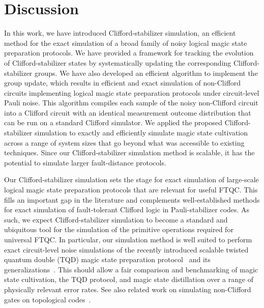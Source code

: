\documentclass[
 reprint,
 amsmath,amssymb,
 pra,superscriptaddress, nofootinbib
]{revtex4-2}
\theoremstyle{definition}
\theoremstyle{plain}
\begin{document}
\section{Discussion}\label{sec:discuss}

In this work, we have introduced Clifford-stabilizer simulation, an efficient method for the exact simulation of a broad family of noisy logical magic state preparation protocols. 
We have provided a framework for tracking the evolution of Clifford-stabilizer states by systematically updating the corresponding Clifford-stabilizer groups.
We have also developed an efficient algorithm to implement the group update, which results in efficient and exact simulation of non-Clifford circuits implementing logical magic state preparation protocols under circuit-level Pauli noise.
This algorithm compiles each sample of the noisy non-Clifford circuit into a Clifford circuit with an identical measurement outcome distribution that can be run on a standard Clifford simulator. 
We applied the proposed Clifford-stabilizer simulation to exactly and efficiently simulate magic state cultivation across a range of system sizes that go beyond what was accessible to existing techniques. 
Since our Clifford-stabilizer simulation method is scalable, it has the potential to simulate larger fault-distance protocols.

Our Clifford-stabilizer simulation sets the stage for exact simulation of large-scale logical magic state preparation protocols that are relevant for useful FTQC.
This fills an important gap in the literature and complements well-established methods for exact simulation of fault-tolerant Clifford logic in Pauli-stabilizer codes. 
As such, we expect Clifford-stabilizer simulation to become a standard and ubiquitous tool for the simulation of the primitive operations required for universal FTQC.
In particular, our simulation method is well suited to perform exact circuit-level noise simulations of the recently introduced scalable twisted quantum double (TQD) magic state preparation protocol~\cite{vrty-qs5h} and its generalizations~\cite{Williamson_2026Low,williamson2026fastmagicstatepreparation,christos2026nonabelianquantumlowdensityparity,j2q4-bnc6,zhu2026nonabelianqldpctqftformalism,huang2025generatinglogicalmagicstates,huang2026hybridlatticesurgerynonclifford,kfxl-rv7c,manjunath2026universalquantumcomputationgroup}. 
This should allow a fair comparison and benchmarking of magic state cultivation, the TQD protocol, and magic state distillation over a range of physically relevant error rates. 
See also related work on simulating non-Clifford gates on topological codes~\cite{bombin20182dquantumcomputation3d,brown2020fault,Scruby2022numerical,PhysRevResearch.4.043052,scruby2025fault}.
\end{document}
